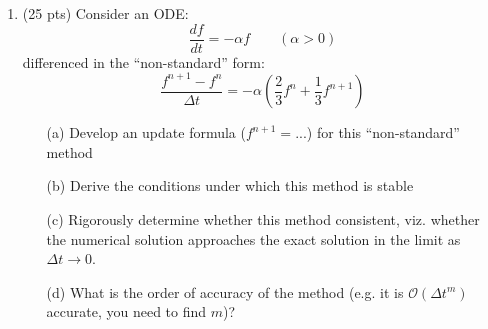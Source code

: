 \documentclass{article}
\begin{document}
\begin{enumerate}

  \item (25 pts) Consider an ODE:  
  \begin{equation}
    \frac{d f}{d t} = -\alpha f \qquad (\alpha > 0)
  \end{equation}
  differenced in the ``non-standard'' form:
  \begin{equation}
    \frac{f^{n+1}-f^n}{\Delta t} = - \alpha \left( \frac{2}{3} f^n + \frac{1}{3} f^{n+1} \right)
  \end{equation}  
  \begin{enumerate}
    \item[(a)] Develop an update formula ($f^{n+1}=...$) for this ``non-standard'' method
    \item[(b)] Derive the conditions under which this method is stable
    \item[(c)] Rigorously determine whether this method consistent, viz. whether the numerical solution approaches the exact solution in the limit as $\Delta t \rightarrow 0$.
    \item[(d)] What is the order of accuracy of the method (e.g. it is $\mathcal{O}(\Delta t^m)$ accurate, you need to find $m$)?
  \end{enumerate}


\end{enumerate}
\end{document}
